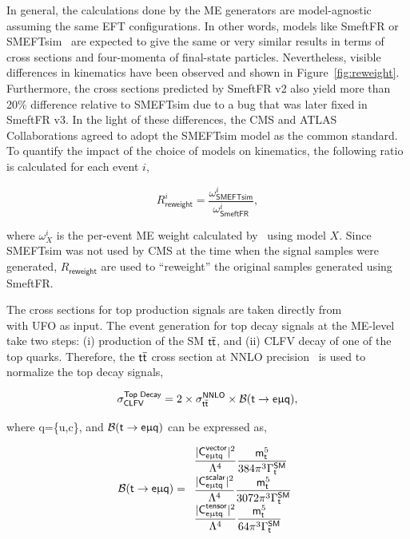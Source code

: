 In general, the calculations done by the \ac{ME} generators are model-agnostic assuming the same \ac{EFT} configurations. In other words, models like SmeftFR or SMEFTsim~\cite{Brivio:2017btx} are expected to give the same or very similar results in terms of cross sections and four-momenta of final-state particles. Nevertheless, visible differences in kinematics have been observed and shown in Figure~\ref{fig:reweight}. Furthermore, the cross sections predicted by SmeftFR v2 also yield more than 20\% difference relative to SMEFTsim due to a bug that was later fixed in SmeftFR v3. In the light of these differences, the \ac{CMS} and \ac{ATLAS} Collaborations agreed to adopt the SMEFTsim model as the common standard.  To quantify the impact of the choice of models on kinematics, the following ratio is calculated for each event $i$,

\begin{equation}
\label{eq:2}
R_{\textsf{reweight}}^{i}=\frac{\omega_{\textsf{SMEFTsim}}^i}{\omega_{\textsf{SmeftFR}}^i},
\end{equation}

where $\omega^{i}_{X}$ is the per-event \ac{ME} weight calculated by \MG~using model $X$. Since SMEFTsim was not used by \ac{CMS} at the time when the signal samples were generated, $R_{\textsf{reweight}}$ are used to ``reweight'' the original samples generated using SmeftFR.

The cross sections for top production signals are taken directly from \MG \\with {} UFO as input. The event generation for top decay signals at the \ac{ME}-level take two steps: (i) production of the SM $\textsf{t}\overline{\textsf{t}}$, and (ii) \ac{CLFV} decay of one of the top quarks. Therefore, the $\textsf{t}\overline{\textsf{t}}$ cross section at \ac{NNLO} precision~\cite{Czakon:2011xx} is used to normalize the top decay signals,

\begin{equation}
\label{eq:3}
\sigma_{\textsf{CLFV}}^{\textsf{Top Decay}}=2\times\sigma_{\textsf{t}\overline{\textsf{t}}}^{\textsf{NNLO}}\times\mathcal{B}(\textsf{t}\rightarrow\textsf{e}\upmu\textsf{q}),
\end{equation}

where q=\{u,c\}, and $\mathcal{B}(\textsf{t}\rightarrow\textsf{e}\upmu\textsf{q})$ \cite{Kile:2008rp} can be expressed as,

\begin{equation}
\label{eq:4}
\mathcal{B}(\textsf{t}\rightarrow\textsf{e}\upmu\textsf{q}) = 
  \begin{array}{l}
  \displaystyle
  \frac{|\textsf{C}^{\textsf{vector}}_{\textsf{e}\upmu\textsf{t{q}}}|^2}{\mathrm{\Lambda}^4}\frac{\textsf{m}_\textsf{t}^5}{384\pi^3\mathrm{\Gamma}_{\textsf{t}}^{\textsf{SM}}} \\
  \displaystyle
  \frac{|\textsf{C}^{\textsf{scalar}}_{\textsf{e}\upmu\textsf{t{q}}}|^2}{\mathrm{\Lambda}^4}\frac{\textsf{m}_\textsf{t}^5}{3072\pi^3\mathrm{\Gamma}_{\textsf{t}}^{\textsf{SM}}} \\
  \displaystyle
  \frac{|\textsf{C}^{\textsf{tensor}}_{\textsf{e}\upmu\textsf{t{q}}}|^2}{\mathrm{\Lambda}^4}\frac{\textsf{m}_\textsf{t}^5}{64\pi^3\mathrm{\Gamma}_{\textsf{t}}^{\textsf{SM}}} 
\end{array}
\end{equation}

